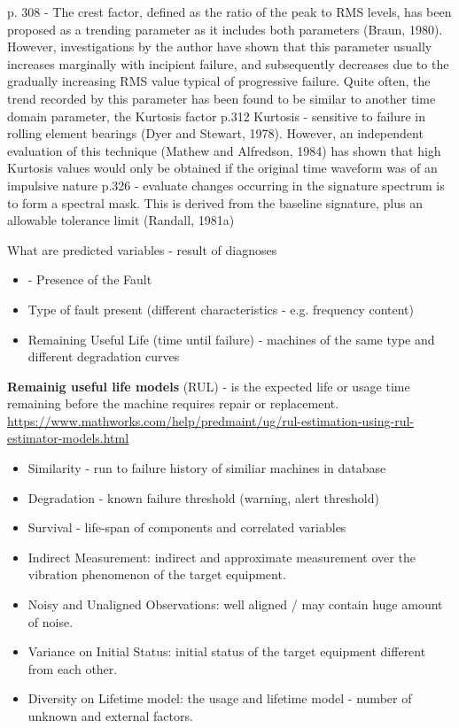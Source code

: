 p. 308 - The crest factor, defined as the ratio of the peak to RMS levels, has been proposed as a trending parameter as it includes both parameters (Braun, 1980). However, investigations by the author have shown that this parameter usually increases marginally with incipient failure, and subsequently decreases due to the gradually increasing RMS value typical of progressive failure. Quite often, the trend recorded by this parameter has been found to be similar to another time domain parameter, the Kurtosis factor
p.312 Kurtosis - sensitive to failure in rolling element bearings (Dyer and Stewart, 1978). However, an independent evaluation of this technique (Mathew and Alfredson, 1984) has shown that high Kurtosis values would only be obtained if the original time waveform was of an impulsive nature
p.326 - evaluate changes occurring in the signature spectrum is to form a spectral mask. This is derived from the baseline signature, plus an allowable tolerance limit (Randall, 1981a)

What are predicted variables - result of diagnoses
\begin{itemize}
\item - Presence of the Fault
\item Type of fault present (different characteristics - e.g. frequency content)
\item Remaining Useful Life (time until failure) - machines of the same type and different degradation curves
\end{itemize}

\textbf{Remainig useful life models} (RUL) - is the expected life or usage time remaining before the machine requires repair or replacement.
\url{https://www.mathworks.com/help/predmaint/ug/rul-estimation-using-rul-estimator-models.html}
\begin{itemize}
\item Similarity - run to failure history of similiar machines in database
\item Degradation - known failure threshold (warning, alert threshold)
\item Survival  - life-span of components and correlated variables
\end{itemize}


\cite{jung_vibration_2017}
\begin{itemize}
\item Indirect Measurement: indirect and approximate measurement over the vibration phenomenon of the target equipment.
\item Noisy and Unaligned Observations: well aligned / may contain huge amount of noise.
\item Variance on Initial Status: initial status of the target equipment different from each other.
\item Diversity on Lifetime model: the usage and lifetime model -  number of unknown and external factors.
\end{itemize}

